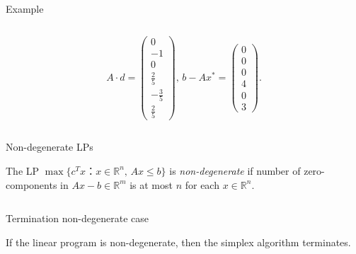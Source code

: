 \begin{frame}{Example}
\begin{columns}[t]
\begin{column}{.5\textwidth}
\begin{displaymath}
  A ⋅ d = \begin{pmatrix}0\\-1\\0\\\frac{2}{5}\\- \frac{3}{5}\\\frac{2}{5}\end{pmatrix}, \, 
  b-Ax^* = 
\begin{pmatrix}0\\0\\0\\4\\0\\3\end{pmatrix}.
\end{displaymath}

    \end{column}       
  \end{columns}
\end{frame}


\begin{frame}{Non-degenerate LPs}

  \begin{definition}
    The LP $\max\{c^Tx ： x ∈ ℝ^n, \, Ax≤b\}$ is \emph{non-degenerate} if number of zero-components in $Ax-b ∈ ℝ^m$ is at most  $n$ for each $x ∈ ℝ^n$. 
  \end{definition}
  
  \begin{columns}
    \begin{column}{.5\textwidth}
      
    \end{column}
    \begin{column}{.5\textwidth}
      
    \end{column}       
  \end{columns}
\end{frame}




\begin{frame}{Termination non-degenerate case}



\begin{theorem}
  \label{thr:s-5}
  If the linear program  is non-degenerate, then the
  simplex algorithm terminates.
\end{theorem}
  
  \begin{columns}
    \begin{column}{.5\textwidth}
      
    \end{column}
    \begin{column}{.5\textwidth}
      
    \end{column}       
  \end{columns}
\end{frame}




